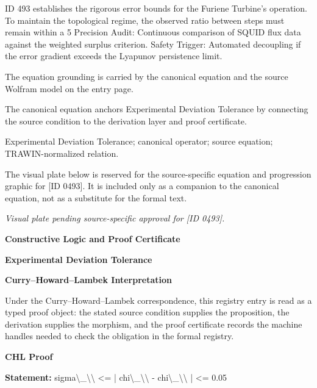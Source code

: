 ID 493 establishes the rigorous error bounds for the Furiene Turbine's operation. To maintain the topological regime, the observed ratio between steps must remain within a 5 Precision Audit: Continuous comparison of SQUID flux data against the weighted surplus criterion. Safety Trigger: Automated decoupling if the error gradient exceeds the Lyapunov persistence limit.

The equation grounding is carried by the canonical equation and the source Wolfram model on the entry page.

The canonical equation anchors Experimental Deviation Tolerance by connecting the source condition to the derivation layer and proof certificate.

Experimental Deviation Tolerance; canonical operator; source equation; TRAWIN-normalized relation.
\endgroup

\begingroup\footnotesize\sloppy
The visual plate below is reserved for the source-specific equation and progression graphic for [ID 0493]. It is included only as a companion to the canonical equation, not as a substitute for the formal text.
\par\endgroup
\begingroup\footnotesize\itshape
Visual plate pending source-specific approval for [ID 0493].
\par\endgroup

\clearpage
\begingroup\tzpsupportsetup
\noindent\textbf{\fontsize{10.8pt}{12.8pt}\selectfont [ID 0493] Constructive Logic and Proof Certificate}\par
\noindent\textbf{\fontsize{10pt}{12pt}\selectfont Experimental Deviation Tolerance}\par
\vspace{0.45em}
\begingroup
\footnotesize
\setlength{\parskip}{0.22em}
\setlength{\parindent}{0pt}
\noindent\textbf{Curry--Howard--Lambek Interpretation}\par
Under the Curry--Howard--Lambek correspondence, this registry entry is read as a typed proof
object: the stated source condition supplies the proposition, the derivation supplies the
morphism, and the proof certificate records the machine handles needed to check the obligation
in the formal registry.

\vspace{0.45em}
\noindent\textbf{CHL Proof}\par
\textbf{Statement:} sigma\textbackslash{}\_\textbackslash{}\textbackslash{} <= | chi\textbackslash{}\_\textbackslash{}\textbackslash{} - chi\textbackslash{}\_\textbackslash{}\textbackslash{} | <= 0.05

